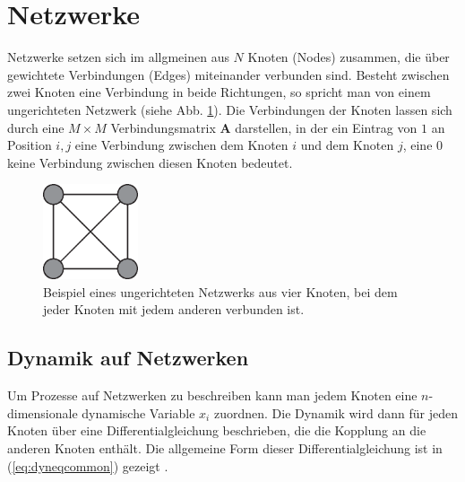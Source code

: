 
\section{Netzwerke}
Netzwerke setzen sich im allgmeinen aus $N$ Knoten (Nodes) zusammen, die über gewichtete Verbindungen (Edges) miteinander verbunden sind. Besteht zwischen zwei Knoten eine Verbindung in beide Richtungen, so spricht man von einem ungerichteten Netzwerk (siehe Abb. \ref{fig:GraphBsp}). Die Verbindungen der Knoten lassen sich durch eine $M\times M$ Verbindungsmatrix $\boldsymbol{A}$ darstellen, in der ein Eintrag von $1$ an Position $i,j$ eine Verbindung zwischen dem Knoten $i$ und dem Knoten $j$, eine $0$ keine Verbindung zwischen diesen Knoten bedeutet.

\begin{figure}[t]
	 \centering
	\includegraphics[width=0.25\textwidth]{abb/misc/GraphBsp.eps}
	\caption[Ungerichteres Netzwerk]{Beispiel eines ungerichteten Netzwerks aus vier Knoten, bei dem jeder Knoten mit jedem anderen verbunden ist.}
	\label{fig:GraphBsp}
\end{figure}


\subsection*{Dynamik auf Netzwerken}
Um Prozesse auf Netzwerken zu beschreiben kann man jedem Knoten eine $n$-dimensionale dynamische Variable $x_i$ zuordnen. Die Dynamik wird dann für jeden Knoten über eine Differentialgleichung beschrieben, die die Kopplung an die anderen Knoten enthält. Die allgemeine Form dieser Differentialgleichung ist in (\ref{eq:dyneqcommon}) gezeigt \cite{pecora1998}.


